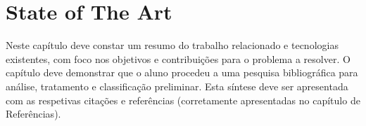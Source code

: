 \chapter{State of The Art} %
\label{chap:state-of-art}

Neste capítulo deve constar um resumo do trabalho relacionado e tecnologias existentes, com foco nos objetivos e contribuições para o problema a resolver. O capítulo deve demonstrar que o aluno procedeu a uma pesquisa bibliográfica para análise, tratamento e classificação preliminar. Esta síntese deve ser apresentada com as respetivas citações e referências (corretamente apresentadas no capítulo de Referências).




